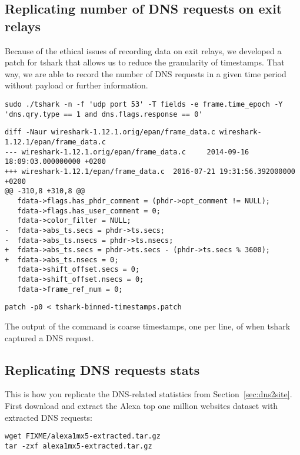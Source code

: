 \subsection{Replicating number of DNS requests on exit relays}
Because of the ethical issues of recording data on exit relays, we developed a
patch for tshark that allows us to reduce the granularity of timestamps.  That
way, we are able to record the number of DNS requests in a given time period
without payload or further information.

\begin{lstlisting}
sudo ./tshark -n -f 'udp port 53' -T fields -e frame.time_epoch -Y 'dns.qry.type == 1 and dns.flags.response == 0'
\end{lstlisting}

\begin{lstlisting}
diff -Naur wireshark-1.12.1.orig/epan/frame_data.c wireshark-1.12.1/epan/frame_data.c
--- wireshark-1.12.1.orig/epan/frame_data.c     2014-09-16 18:09:03.000000000 +0200
+++ wireshark-1.12.1/epan/frame_data.c  2016-07-21 19:31:56.392000000 +0200
@@ -310,8 +310,8 @@
   fdata->flags.has_phdr_comment = (phdr->opt_comment != NULL);
   fdata->flags.has_user_comment = 0;
   fdata->color_filter = NULL;
-  fdata->abs_ts.secs = phdr->ts.secs;
-  fdata->abs_ts.nsecs = phdr->ts.nsecs;
+  fdata->abs_ts.secs = phdr->ts.secs - (phdr->ts.secs % 3600);
+  fdata->abs_ts.nsecs = 0;
   fdata->shift_offset.secs = 0;
   fdata->shift_offset.nsecs = 0;
   fdata->frame_ref_num = 0;
\end{lstlisting}

\begin{lstlisting}
patch -p0 < tshark-binned-timestamps.patch
\end{lstlisting}

The output of the command is coarse timestamps, one per line, of when tshark
captured a DNS request.

\subsection{Replicating DNS requests stats}
This is how you replicate the DNS-related statistics from
Section~\ref{sec:dns2site}.  First download and extract the Alexa top one
million websites dataset with extracted DNS requests:

\begin{lstlisting}
wget FIXME/alexa1mx5-extracted.tar.gz
tar -zxf alexa1mx5-extracted.tar.gz
\end{lstlisting}

